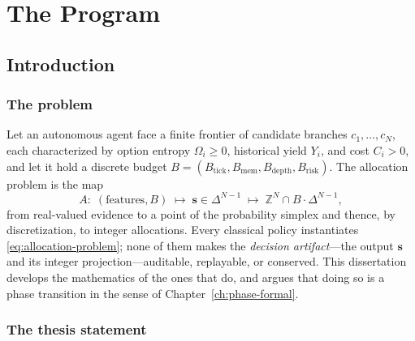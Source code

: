 \documentclass[12pt,oneside]{report}
\theoremstyle{plain}
\theoremstyle{definition}
\theoremstyle{remark}
\newcommand{\Z}{\mathbb{Z}}
\newcommand{\simplex}{\Delta}
\newcommand{\shares}{\mathbf{s}}
\begin{document}
\begin{abstract}
The dissertation's method is its own subject: a falsification ledger in
which the circular benchmark, the every-softmax ``theorems,'' the
notational equivalence proof, the local reference implementation, and
most recently the coverage-floor conjecture were each deleted or refuted
with commit-anchored receipts. What survives is the governance envelope
and its phase-change structure, argued with explicit disanalogies and
falsifiers.
\end{abstract}

\tableofcontents

\part{The Program}

\chapter{Introduction}
\label{ch:intro}

\section{The problem}

Let an autonomous agent face a finite frontier of candidate branches
$c_1,\dots,c_N$, each characterized by option entropy $\Omega_i \ge 0$,
historical yield $Y_i$, and cost $C_i > 0$, and let it hold a discrete
budget $B=(B_{\mathrm{tick}}, B_{\mathrm{mem}}, B_{\mathrm{depth}},
B_{\mathrm{risk}})$. The allocation problem is the map
\begin{equation}
A:\; (\text{features}, B) \;\longmapsto\; \shares \in \simplex^{N-1}
\;\longmapsto\; \Z^N \cap B\!\cdot\!\simplex^{N-1},
\label{eq:allocation-problem}
\end{equation}
from real-valued evidence to a point of the probability simplex and
thence, by discretization, to integer allocations. Every classical
policy instantiates \eqref{eq:allocation-problem}; none of them makes
the \emph{decision artifact}---the output $\shares$ and its integer
projection---auditable, replayable, or conserved. This dissertation
develops the mathematics of the ones that do, and argues that doing so
is a phase transition in the sense of Chapter~\ref{ch:phase-formal}.

\section{The thesis statement}
\end{document}

